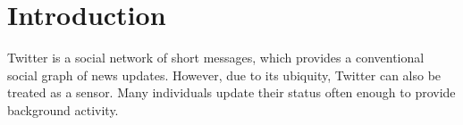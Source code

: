 \section{Introduction}
Twitter is a social network of short messages, which provides a conventional social graph of news updates.  However, due to its ubiquity, Twitter can also be treated as a sensor.  Many individuals update their status often enough to provide background activity.